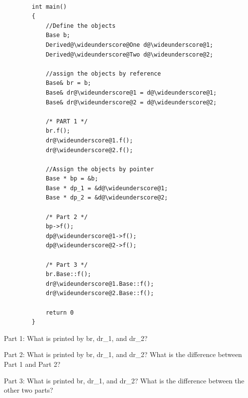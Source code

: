 \documentclass{article}
\begin{document}
\begin{enumerate}[label=(\alph*), itemsep = 120pt]
\begin{lstlisting}[style = CStyle]
    
        int main()
        {
            //Define the objects
            Base b;
            Derived@\wideunderscore@One d@\wideunderscore@1;
            Derived@\wideunderscore@Two d@\wideunderscore@2;

            //assign the objects by reference
            Base& br = b;
            Base& dr@\wideunderscore@1 = d@\wideunderscore@1;
            Base& dr@\wideunderscore@2 = d@\wideunderscore@2;

            /* PART 1 */
            br.f();
            dr@\wideunderscore@1.f();
            dr@\wideunderscore@2.f();

            //Assign the objects by pointer
            Base * bp = &b;
            Base * dp_1 = &d@\wideunderscore@1;
            Base * dp_2 = &d@\wideunderscore@2;

            /* Part 2 */
            bp->f();
            dp@\wideunderscore@1->f();
            dp@\wideunderscore@2->f();

            /* Part 3 */
            br.Base::f();
            dr@\wideunderscore@1.Base::f();
            dr@\wideunderscore@2.Base::f();

            return 0
        }
    \end{lstlisting}
    Part 1:
    What is printed by br, dr\_1, and dr\_2?

    \vspace{2cm}
    Part 2:
    What is printed by br, dr\_1, and dr\_2? What is the difference between Part 1 and Part 2?

    \vspace{2cm}
    Part 3:
    What is printed br, dr\_1, and dr\_2? What is the difference between the other two parts?
    \vspace{2cm}
    
    \end{enumerate}


    
\end{document}
